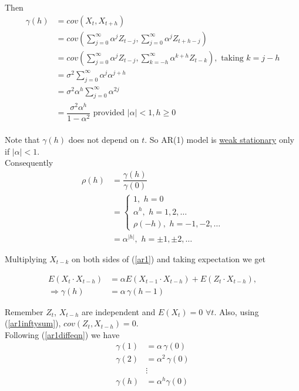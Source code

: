 \documentclass[11pt, a4paper]{article}
\begin{document}
Then
\begin{align*}
\gamma(h) &= cov(X_t, X_{t+h}) \\[0.25em]
&= cov\left(\sum \limits_{j = 0}^{\infty} \alpha^j Z_{t-j}, \sum \limits_{j = 0}^{\infty} \alpha^j Z_{t+h-j}\right) \\[0.25em]
&= cov \left(\sum \limits_{j = 0}^{\infty} \alpha^j Z_{t-j}, \sum \limits_{k = - h}^{\infty} \alpha^{k+h} Z_{t-k} \right), \,\, \text{taking } k = j - h \\[0.25em]
&= \sigma^2 \sum \limits_{j = 0}^{\infty} \alpha^j \alpha^{j+h} \\[0.25em]
&= \sigma^2 \alpha^h \sum \limits_{j = 0}^{\infty} \alpha^{2j} \\[0.25em]
&= \dfrac{\sigma^2 \alpha^h}{1 - \alpha^2} \text{ provided } |\alpha| < 1, h \geq 0
\end{align*}
\\
Note that $\gamma(h)$ does not depend on $t$. So AR(1) model is \underline{weak stationary} only if $|\alpha| < 1$. \\

Consequently
\begin{align*}
\rho(h) &= \dfrac{\gamma(h)}{\gamma(0)} \\[0.25em]
&= \begin{cases} 
1, \,\, h = 0 \\
\alpha^h, \,\, h = 1, 2, \ldots \\
\rho(-h), \,\, h = -1, -2, \ldots
\end{cases} \\[0.25em]
&= \alpha^{|h|}, \,\, h = \pm 1, \pm 2, \ldots
\end{align*}

Multiplying $X_{t-k}$ on both sides of (\ref{ar1}) and taking expectation we get

\begin{align}\label{ar1diffeqn}
E(X_t \cdot X_{t-h}) &= \alpha E(X_{t-1} \cdot X_{t-h}) + E(Z_{t} \cdot X_{t-h}),  \nonumber \\[0.25em]
\Rightarrow \gamma(h) &= \alpha \, \gamma(h-1)
\end{align}

Remember $Z_t$, $X_{t-h}$ are independent and $E(X_t) = 0$ $\forall t$. Also, using (\ref{ar1inftysum}), $cov(Z_{t}, X_{t-h}) = 0$.\\

Following (\ref{ar1diffeqn}) we have
\begin{align}\label{ar1reqrel}
\gamma(1) &= \alpha \, \gamma(0) \nonumber \\[0.25em]
\gamma(2) &= \alpha^2 \, \gamma(0) \nonumber \\[0.25em]
&\vdots \nonumber \\[0.25em]
\gamma(h) &= \alpha^h \gamma(0)
\end{align}
\end{document}
